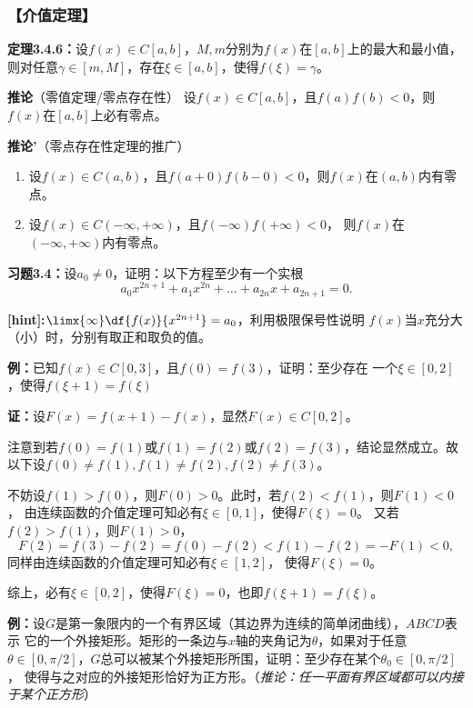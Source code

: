 \subsubsection{【介值定理】}

{\bf 定理3.4.6：}设$f(x)\in C[a,b]$，$M,m$分别为$f(x)$在$[a,b]$上的最大和最小值，
则对任意$\gamma\in[m,M]$，存在$\xi\in[a,b]$，使得$f(\xi)=\gamma$。

{\bf 推论}（零值定理/零点存在性）
设$f(x)\in C[a,b]$，且$f(a)f(b)<0$，则$f(x)$在$[a,b]$上必有零点。

{\bf 推论'}（零点存在性定理的推广）
\begin{enumerate}[(1)]
  \setlength{\itemindent}{1cm}
  \item 设$f(x)\in C(a,b)$，且$f(a+0)f(b-0)<0$，则$f(x)$在$(a,b)$内有零点。 
  \item 设$f(x)\in C(-\infty,+\infty)$，且$f(-\infty)f(+\infty)<0$，
  则$f(x)$在$(-\infty,+\infty)$内有零点。
\end{enumerate}

{\bf 习题3.4：}设$a_0\ne 0$，证明：以下方程至少有一个实根
$$a_0x^{2n+1}+a_1x^{2n}+\ldots+a_{2n}x+a_{2n+1}=0.$$

{\bf [hint]:}$\limx{\infty}\df{f(x)}{x^{2n+1}}=a_0$，利用极限保号性说明
$f(x)$当$x$充分大（小）时，分别有取正和取负的值。

{\bf 例：}已知$f(x)\in C[0,3]$，且$f(0)=f(3)$，证明：至少存在
一个$\xi\in[0,2]$，使得$f(\xi+1)=f(\xi)$

{\bf 证：}设$F(x)=f(x+1)-f(x)$，显然$F(x)\in C[0,2]$。

注意到若$f(0)=f(1)$或$f(1)=f(2)$或$f(2)=f(3)$，结论显然成立。故以下设$f(0)\ne f(1),
f(1)\ne f(2),f(2)\ne f(3)$。

不妨设$f(1)>f(0)$，则$F(0)>0$。此时，若$f(2)<f(1)$，则$F(1)<0$，
由连续函数的介值定理可知必有$\xi\in[0,1]$，使得$F(\xi)=0$。
又若$f(2)>f(1)$，则$F(1)>0$，
$$F(2)=f(3)-f(2)=f(0)-f(2)<f(1)-f(2)=-F(1)<0,$$
同样由连续函数的介值定理可知必有$\xi\in[1,2]$，
使得$F(\xi)=0$。

综上，必有$\xi\in[0,2]$，使得$F(\xi)=0$，也即$f(\xi+1)=f(\xi)$。

\newpage

{\bf 例：}设$G$是第一象限内的一个有界区域（其边界为连续的简单闭曲线），$ABCD$表示
它的一个外接矩形。矩形的一条边与$x$轴的夹角记为$\theta$，如果对于任意$\theta\in
[0,\pi/2]$，$G$总可以被某个外接矩形所围，证明：至少存在某个$\theta_0\in[0,\pi/2]$，
使得与之对应的外接矩形恰好为正方形。（{\it 推论：任一平面有界区域都可以内接于某个正方形}）

